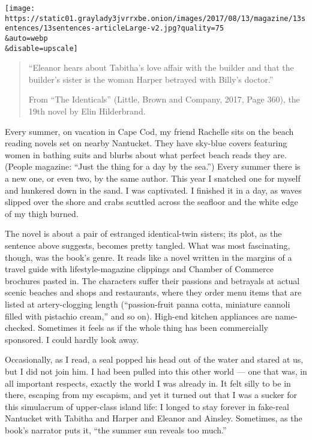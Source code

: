 \texttt{[image: https://static01.graylady3jvrrxbe.onion/images/2017/08/13/magazine/13sentences/13sentences-articleLarge-v2.jpg?quality=75\\\&auto=webp\\\&disable=upscale]}

\begin{quote}
``Eleanor hears about Tabitha's love affair with the builder and that
the builder's sister is the woman Harper betrayed with Billy's doctor.''

From ``The Identicals'' (Little, Brown and Company, 2017, Page 360), the
19th novel by Elin Hilderbrand.
\end{quote}

Every summer, on vacation in Cape Cod, my friend Rachelle sits on the
beach reading novels set on nearby Nantucket. They have sky-blue covers
featuring women in bathing suits and blurbs about what perfect beach
reads they are. (People magazine: ``Just the thing for a day by the
sea.'') Every summer there is a new one, or even two, by the same
author. This year I snatched one for myself and hunkered down in the
sand. I was captivated. I finished it in a day, as waves slipped over
the shore and crabs scuttled across the seafloor and the white edge of
my thigh burned.

The novel is about a pair of estranged identical-twin sisters; its plot,
as the sentence above suggests, becomes pretty tangled. What was most
fascinating, though, was the book's genre. It reads like a novel written
in the margins of a travel guide with lifestyle-magazine clippings and
Chamber of Commerce brochures pasted in. The characters suffer their
passions and betrayals at actual scenic beaches and shops and
restaurants, where they order menu items that are listed at
artery-clogging length (``passion-fruit panna cotta, miniature cannoli
filled with pistachio cream,'' and so on). High-end kitchen appliances
are name-checked. Sometimes it feels as if the whole thing has been
commercially sponsored. I could hardly look away.

Occasionally, as I read, a seal popped his head out of the water and
stared at us, but I did not join him. I had been pulled into this other
world --- one that was, in all important respects, exactly the world I
was already in. It felt silly to be in there, escaping from my escapism,
and yet it turned out that I was a sucker for this simulacrum of
upper-class island life: I longed to stay forever in fake-real Nantucket
with Tabitha and Harper and Eleanor and Ainsley. Sometimes, as the
book's narrator puts it, ``the summer sun reveals too much.''

